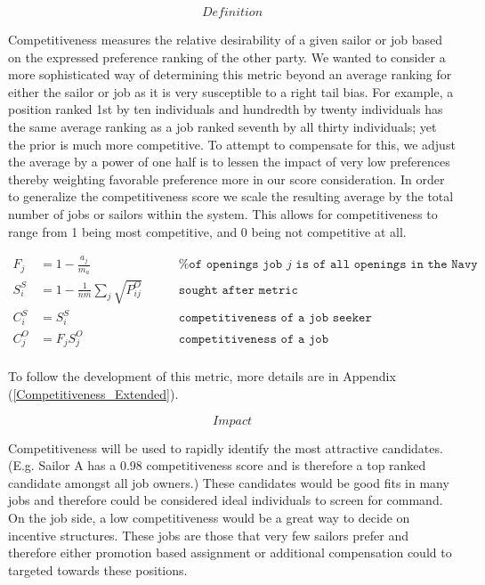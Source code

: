 \[\textit{Definition}\]

Competitiveness measures the relative desirability of a given sailor or job based on the expressed preference ranking of the other party. We wanted to consider a more sophisticated way of determining this metric beyond an average ranking for either the sailor or job as it is very susceptible to a right tail bias.  For example, a position ranked 1st by ten individuals and hundredth by twenty individuals has the same average ranking as a job ranked seventh by all thirty individuals; yet the prior is much more competitive. To attempt to compensate for this, we adjust the average by a power of one half is to lessen the impact of very low preferences thereby weighting favorable preference more in our score consideration. 
 In order to generalize the competitiveness score we scale the resulting average by the total number of jobs or sailors within the system. This allows for competitiveness to range from 1 being most competitive, and 0 being not competitive at all.

\begin{align}
F_j &= 1 - \frac{a_j}{m_a} \quad&&\texttt{ \% of openings job $j$ is of all openings in the Navy} \\ 
S^S_i &= 1 - \frac{1}{nm} \sum_j \sqrt{P_{ij}^O} \quad &&\texttt{ sought after metric} \\
C_i^S &= S^S_i \quad &&\texttt{ competitiveness of a job seeker} \\
C_j^O &= F_j S^O_j \quad  &&\texttt{ competitiveness of a job} \\
\end{align}

To follow the development of this metric, more details are in Appendix (\ref{Competitiveness_Extended}).

\[\textit{Impact}\]

Competitiveness will be used to rapidly identify the most attractive candidates. (E.g. Sailor A has a 0.98 competitiveness score and is therefore a top ranked candidate amongst all job owners.) These candidates would be good fits in many jobs and therefore could be considered ideal individuals to screen for command. On the job side, a low competitiveness would be a great way to decide on incentive structures. These jobs are those that very few sailors prefer and therefore either promotion based assignment or additional compensation could to targeted towards these positions. 